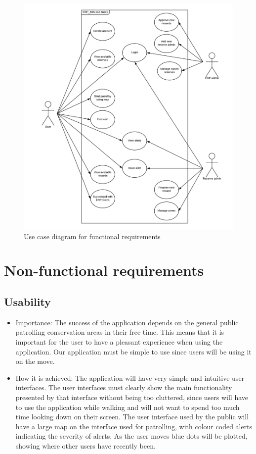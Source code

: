 \documentclass{article}
\begin{document}
\begin{figure}[h]
\centering
\includegraphics[scale=0.5]{UseCase.png}
\caption{Use case diagram for functional requirements}
\end{figure}

\section{Non-functional requirements}
\subsection{Usability}
\begin{itemize}
\item Importance: The success of the application depends on the general public patrolling conservation areas in their free time. This means that it is important for the user to have a pleasant experience when using the application. Our application must be simple to use since users will be using it on the move. 
\item How it is achieved: The application will have very simple and intuitive user interfaces. The user interfaces must clearly show the main functionality presented by that interface without being too cluttered, since users will have to use the application while walking and will not want to spend too much time looking down on their screen. The user interface used by the public will have a large map on the interface used for patrolling, with colour coded alerts indicating the severity of alerts. As the user moves blue dots will be plotted, showing where other users have recently been.
\end{itemize}
\end{document}
